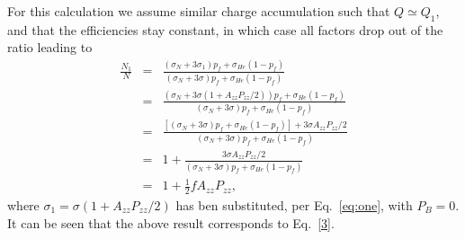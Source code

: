 For
this calculation we assume similar charge accumulation such that $Q\simeq Q_1$, 
and that the efficiencies stay constant, in which case all factors drop out of 
the ratio leading to
\begin{eqnarray}
\nonumber \frac{N_1}{N}& = &\frac{{(\sigma_N+3\sigma_1)p_f+\sigma_{He}(1-p_f)}
}{(\sigma_N+3\sigma)p_f+\sigma_{He}(1-p_f)}\\
\nonumber & = & \frac{{(\sigma_N+3\sigma(1+A_{zz}P_{zz}/2))p_f+\sigma_{He}(1-p_
f)}}{(\sigma_N+3\sigma)p_f+\sigma_{He}(1-p_f)}\\
\nonumber & = & \frac{{[(\sigma_N+3\sigma)p_f+\sigma_{He}(1-p_
f)]+3\sigma A_{zz}P_{zz}/2}}{(\sigma_N+3\sigma)p_f+\sigma_{He}(1-p_f)}\\
\nonumber & = & 1 + \frac{3\sigma 
A_{zz}P_{zz}/2}{(\sigma_N+3\sigma)p_f+\sigma_{He}(1-p_f)}\\
& = & 1 + \frac{1}{2} f A_{zz}P_{zz}, 
\end{eqnarray}
where $\sigma_1 = \sigma(1+A_{zz}P_{zz}/2)$ has ben substituted, per 
Eq.~\ref{eq:one}, with $P_B =0$. It can be seen that the above result 
corresponds to Eq.~\ref{3}.